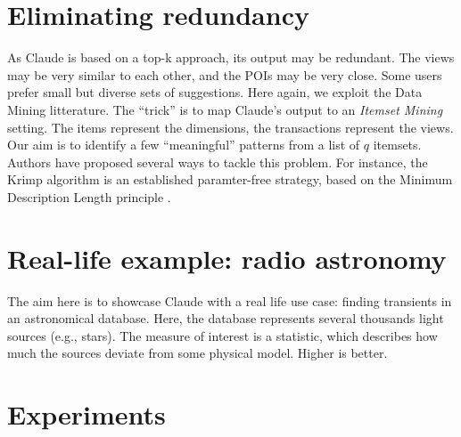\section{Eliminating redundancy}
As Claude is based on a top-k approach, its output may be redundant.  The views
may be very similar to each other, and the POIs may be very close.  Some users
prefer small but diverse sets of suggestions. Here again, we exploit the Data
Mining litterature. The ``trick'' is to map Claude's output to an \emph{Itemset
Mining} setting.  The items represent the dimensions, the transactions
represent the views. Our aim is to identify a few ``meaningful'' patterns from
a list of $q$ itemsets. Authors have proposed several ways to tackle this
problem. For instance, the Krimp algorithm is an established paramter-free
strategy, based on the Minimum Description Length principle
\cite{vreeken2011krimp}.


\section{Real-life example: radio astronomy}
The aim here is to showcase Claude with a real life use case: finding
transients in an astronomical database. Here, the database represents several
thousands light sources (e.g., stars). The measure of interest is a statistic,
which describes how much the sources deviate from some physical model. Higher
is better.


\section{Experiments}
